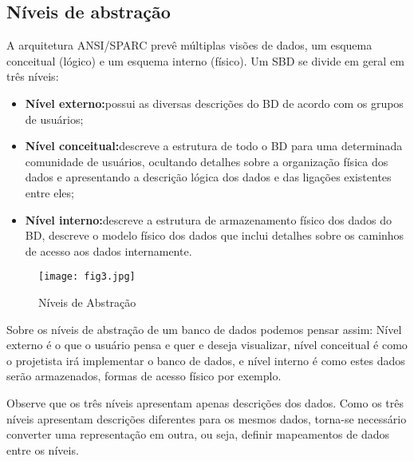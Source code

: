 \documentclass{article}
\begin{document}
\subsection{Níveis de abstração}
A arquitetura ANSI/SPARC prevê múltiplas visões de dados, um esquema conceitual (lógico) e um esquema interno (físico). Um SBD se divide em geral em três níveis:
\begin{itemize}
    \item \textbf{Nível externo:}possui as diversas descrições do BD de acordo com os grupos de usuários;
    \item \textbf{Nível conceitual:}descreve a estrutura de todo o BD para uma determinada comunidade de usuários, ocultando detalhes sobre a organização física dos dados e apresentando a descrição lógica dos dados e das ligações existentes entre eles;
    \item \textbf{Nível interno:}descreve a estrutura de armazenamento físico dos dados do BD, descreve o modelo físico dos dados que inclui detalhes sobre os caminhos de acesso aos dados internamente.
\end{itemize}

\begin{figure}[h]
    \centering
    \texttt{[image: fig3.jpg]}
    \caption{Níveis de Abstração}
    \label{fig:fig3}
\end{figure}

Sobre os níveis de abstração de um banco de dados podemos pensar assim: Nível externo é o que o usuário pensa e quer e deseja visualizar, nível conceitual é como o projetista irá implementar o banco de dados, e nível interno é como estes dados serão armazenados, formas de acesso físico por exemplo.

Observe que os três níveis apresentam apenas descrições dos dados. Como os três níveis apresentam descrições diferentes para os mesmos dados, torna-se necessário converter uma representação em outra, ou seja, definir mapeamentos de dados entre os níveis.
\end{document}
